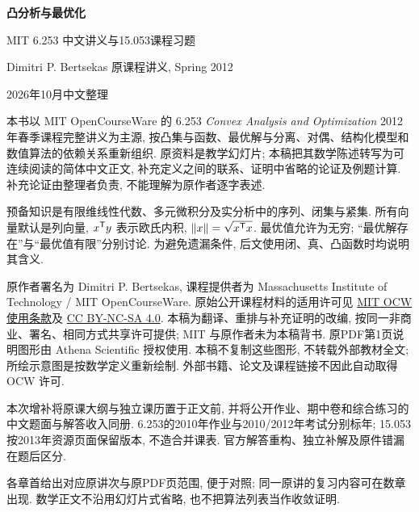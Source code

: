 \frontmatter
\thispagestyle{cover}
\begin{center}
{\color{structurecolor}\bfseries\fontsize{20}{28}\selectfont 凸分析与最优化\par}
\vspace{8pt}
{\large MIT 6.253 中文讲义与15.053课程习题\par}
\vspace{10pt}
Dimitri P. Bertsekas 原课程讲义, Spring 2012\par
2026年10月中文整理\par
\end{center}
\originalpreface
本书以 MIT OpenCourseWare 的 6.253 \emph{Convex Analysis and Optimization} 2012 年春季课程完整讲义为主源, 按凸集与函数、最优解与分离、对偶、结构化模型和数值算法的依赖关系重新组织. 原资料是教学幻灯片; 本稿把其数学陈述转写为可连续阅读的简体中文正文, 补充定义之间的联系、证明中省略的论证及例题计算. 补充论证由整理者负责, 不能理解为原作者逐字表述.

预备知识是有限维线性代数、多元微积分及实分析中的序列、闭集与紧集. 所有向量默认是列向量, $x^{\mathsf T} y$ 表示欧氏内积, $\lVert x\rVert=\sqrt{x^{\mathsf T} x}$. 最优值允许为无穷; “最优解存在”与“最优值有限”分别讨论. 为避免遗漏条件, 后文使用闭、真、凸函数时均说明其含义.

原作者署名为 Dimitri P. Bertsekas, 课程提供者为 Massachusetts Institute of Technology / MIT OpenCourseWare. 原始公开课程材料的适用许可见 \href{https://ocw.mit.edu/pages/privacy-and-terms-of-use/}{MIT OCW 使用条款}及 \href{https://creativecommons.org/licenses/by-nc-sa/4.0/}{CC BY-NC-SA 4.0}. 本稿为翻译、重排与补充证明的改编, 按同一非商业、署名、相同方式共享许可提供; MIT 与原作者未为本稿背书. 原PDF第1页说明图形由 Athena Scientific 授权使用. 本稿不复制这些图形, 不转载外部教材全文; 所绘示意图是按数学定义重新绘制. 外部书籍、论文及课程链接不因此自动取得 OCW 许可.

本次增补将原课大纲与独立课历置于正文前, 并将公开作业、期中卷和综合练习的中文题面与解答收入同册. 6.253的2010年作业与2010/2012年考试分别标年; 15.053按2013年资源页面保留版本, 不造合并课表. 官方解答重构、独立补解及原件错漏在题后区分.

各章首给出对应原讲次与原PDF页范围, 便于对照; 同一原讲的复习内容可在数章出现. 数学正文不沿用幻灯片式省略, 也不把算法列表当作收敛证明.

\clearpage
\originalcontents
\clearpage
\mainmatter





















